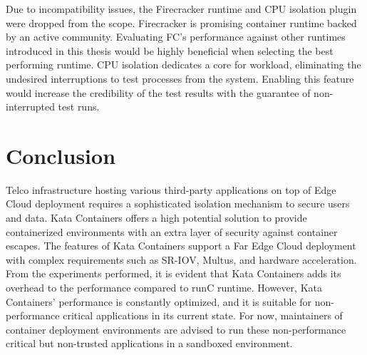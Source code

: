 Due to incompatibility issues, the Firecracker runtime and CPU isolation plugin were dropped from the scope. Firecracker is promising container runtime backed by an active community. Evaluating FC's performance against other runtimes introduced in this thesis would be highly beneficial when selecting the best performing runtime. CPU isolation dedicates a core for workload, eliminating the undesired interruptions to test processes from the system. Enabling this feature would increase the credibility of the test results with the guarantee of non-interrupted test runs.

\section{Conclusion}

Telco infrastructure hosting various third-party applications on top of Edge Cloud deployment requires a sophisticated isolation mechanism to secure users and data. Kata Containers offers a high potential solution to provide containerized environments with an extra layer of security against container escapes. The features of Kata Containers support a Far Edge Cloud deployment with complex requirements such as SR-IOV, Multus, and hardware acceleration. From the experiments performed, it is evident that Kata Containers adds its overhead to the performance compared to runC runtime. However, Kata Containers' performance is constantly optimized, and it is suitable for non-performance critical applications in its current state. For now, maintainers of container deployment environments are advised to run these non-performance critical but non-trusted applications in a sandboxed environment.